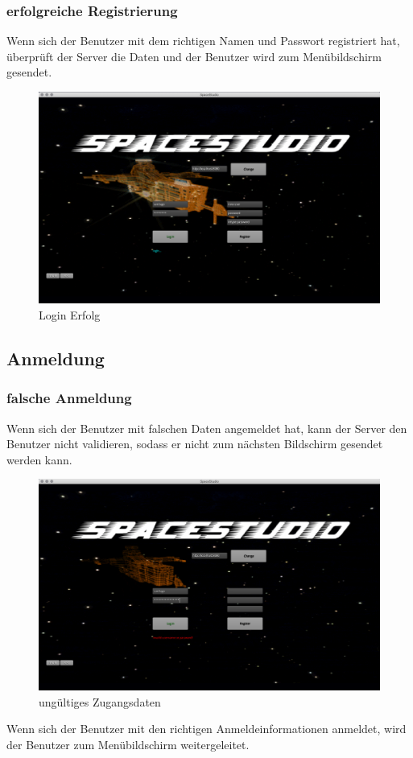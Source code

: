 \documentclass[12pt]{article}
\begin{document}
\subsubsection{erfolgreiche  Registrierung}
Wenn sich der Benutzer mit dem richtigen Namen und Passwort registriert hat, überprüft der Server die Daten und der Benutzer wird zum Menübildschirm gesendet.\\

\begin{figure}[h]
\centering
\includegraphics[scale=0.3]{TestProtocolBilder/erfolgLogin.png}
\caption{Login Erfolg}
\end{figure}
\newpage
\subsection{Anmeldung}
\subsubsection{ falsche Anmeldung}
Wenn sich der Benutzer mit falschen Daten angemeldet hat, kann der Server den Benutzer nicht validieren, sodass er nicht zum nächsten Bildschirm gesendet werden kann.
\begin{figure}[h]
\centering
\includegraphics[scale=0.3]{TestProtocolBilder/invalidCredentials.png}
\caption{ungültiges Zugangsdaten}
\end{figure}
\newpage
Wenn sich der Benutzer mit den richtigen Anmeldeinformationen anmeldet, wird der Benutzer zum Menübildschirm weitergeleitet.\\
\end{document}
